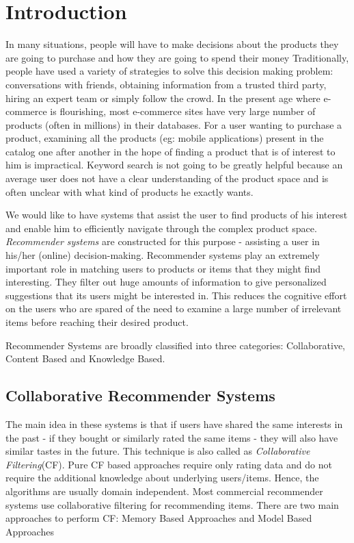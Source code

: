 
\chapter{Introduction}
\label{chap:intro}
In many situations, people will have to make decisions about the products they are going to purchase and how they are going to spend their money 
Traditionally, people have used a variety of strategies to solve this decision making problem: conversations with friends, obtaining information from a trusted third party, hiring an expert team or simply follow the crowd. 
In the present age where e-commerce is flourishing, most e-commerce sites have very large number of products (often in millions) in their databases.
For a user wanting to purchase a product, examining all the products (eg: mobile applications) present in the catalog one after another in the hope of finding a product that is of interest to him is impractical.
Keyword search is not going to be greatly helpful because an average user does not have a clear understanding of the product space and is often unclear with what kind of products he exactly wants.

We would like to have systems that assist the user to find products of his interest and enable him to efficiently navigate through the complex product space.
\textit{Recommender systems} are constructed for this purpose - assisting a user in his/her (online) decision-making.
Recommender systems play an extremely important role in matching users to products or items that they might find interesting. 
They filter out huge amounts of information to give personalized suggestions that its users might be interested in. 
This reduces the cognitive effort on the users who are spared of the need to examine a large number of irrelevant items before reaching their desired product.

Recommender Systems are broadly classified into three categories: Collaborative, Content Based and Knowledge Based.

\section{Collaborative Recommender Systems}
\label{sec:CF}
 The main idea in these systems is that if users have shared the same interests in the past - if they bought or similarly rated the same items - they will also have similar tastes in the future. 
This technique is also called as \textit{Collaborative Filtering}(CF). 
Pure CF based approaches require only rating data and do not require the additional knowledge about underlying users/items. 
Hence, the algorithms are usually domain independent. Most commercial recommender systems use collaborative filtering for recommending items.
There are two main approaches to perform CF: Memory Based Approaches and Model Based Approaches

